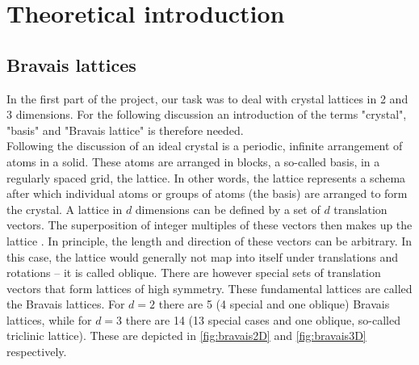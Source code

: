 \documentclass[11pt,a4paper]{article}
\begin{document}
\setcounter{page}{1}
\pagestyle{plain}

\section{Theoretical introduction}
\label{sec:Theoretical introduction}

\subsection{Bravais lattices}
\label{ssec:Bravais lattices}
In the first part of the project, our task was to deal with crystal lattices in 2 and 3 dimensions. 
For the following discussion an introduction of the terms "crystal", "basis" and "Bravais lattice" is therefore needed. \\

Following the discussion of \cite{kittelChapter1Crystal2005} an ideal crystal is a periodic, infinite arrangement of atoms in a solid. 
These atoms are arranged in blocks, a so-called basis, in a regularly spaced grid, the lattice. 
In other words, the lattice represents a schema after which individual atoms or groups of atoms (the basis) are arranged to form the crystal. 
A lattice in $d$ dimensions can be defined by a set of $d$ translation vectors. 
The superposition of integer multiples of these vectors then makes up the lattice \cite{kittelChapter1Crystal2005}. 
In principle, the length and direction of these vectors can be arbitrary. 
In this case, the lattice would generally not map into itself under translations and rotations -- it is called oblique. 
There are however special sets of translation vectors that form lattices of high symmetry. 
These fundamental lattices are called the Bravais lattices. 
For $d=2$ there are 5 (4 special and one oblique) Bravais lattices, while for $d=3$ there are 14 (13 special cases and one oblique, so-called triclinic lattice). 
These are depicted in \autoref{fig:bravais2D} and \autoref{fig:bravais3D} respectively. 
\end{document}
